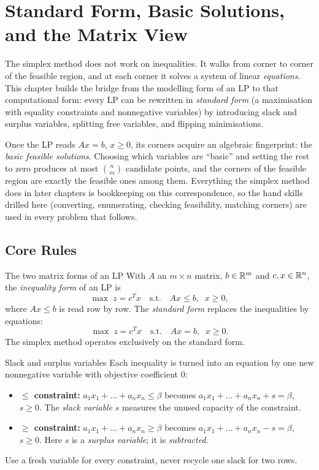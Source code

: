 \chapter{Standard Form, Basic Solutions, and the Matrix View}

The simplex method does not work on inequalities. It walks from corner to
corner of the feasible region, and at each corner it solves a system of
linear \emph{equations}. This chapter builds the bridge from the modelling
form of an LP to that computational form: every LP can be rewritten in
\emph{standard form} (a maximisation with equality
constraints and nonnegative variables) by introducing slack and surplus
variables, splitting free variables, and flipping minimisations.

Once the LP reads $Ax=b$, $x\ge 0$, its corners acquire an algebraic
fingerprint: the \emph{basic feasible solutions}. Choosing which variables
are ``basic'' and setting the rest to zero produces at most
$\binom{n}{m}$ candidate points, and the corners of the feasible region are
exactly the feasible ones among them. Everything the simplex method does in
later chapters is bookkeeping on this correspondence, so the hand skills
drilled here (converting, enumerating, checking feasibility, matching
corners) are used in every problem that follows.

\section{Core Rules}

\begin{rulebox}{The two matrix forms of an LP}
With $A$ an $m\times n$ matrix, $b\in\mathbb{R}^{m}$ and $c,x\in\mathbb{R}^{n}$, the
\emph{inequality form} of an LP is
\[
  \max\; z=c^{T}x
  \quad\text{s.t.}\quad Ax\le b,\;\; x\ge 0 ,
\]
where $Ax\le b$ is read row by row. The \emph{standard form} replaces the inequalities by equations:
\[
  \max\; z=c^{T}x
  \quad\text{s.t.}\quad Ax=b,\;\; x\ge 0 .
\]
The simplex method operates exclusively on the standard form.
\end{rulebox}

\begin{rulebox}{Slack and surplus variables}
Each inequality is turned into an equation by one new nonnegative variable
with objective coefficient $0$:
\begin{itemize}[leftmargin=1.6em,itemsep=0.3ex]
  \item \textbf{$\le$ constraint:} $a_{1}x_{1}+\dots+a_{n}x_{n}\le \beta$
        becomes $a_{1}x_{1}+\dots+a_{n}x_{n}+s=\beta$, $s\ge 0$. The
        \emph{slack variable} $s$ measures the unused
        capacity of the constraint.
  \item \textbf{$\ge$ constraint:} $a_{1}x_{1}+\dots+a_{n}x_{n}\ge \beta$
        becomes $a_{1}x_{1}+\dots+a_{n}x_{n}-s=\beta$, $s\ge 0$. Here $s$
        is a \emph{surplus variable}; it is
        \emph{subtracted}.
\end{itemize}
Use a fresh variable for every constraint, never recycle one slack for
two rows.
\end{rulebox}

